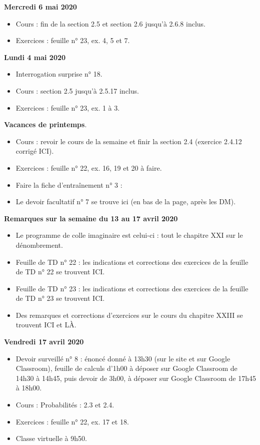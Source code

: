 \documentclass[12pt,a4paper]{article}
\begin{document}
\noindent\textbf{Mercredi 6 mai 2020}
\begin{itemize}
\item Cours : fin de la section 2.5 et section 2.6 jusqu'à 2.6.8 inclus.
\item Exercices : feuille n° 23, ex. 4, 5 et 7.\vspace{.4cm}
\end{itemize}
 
\noindent\textbf{Lundi 4 mai 2020}
\begin{itemize}
\item Interrogation surprise n° 18.
\item Cours : section 2.5 jusqu'à 2.5.17 inclus.
\item Exercices : feuille n° 23, ex. 1 à 3.\vspace{.4cm}
\end{itemize}
 
\noindent\textbf{\bf Vacances de printemps}.\vspace{.4cm}\\
\begin{itemize}
\item Cours : revoir le cours de la semaine et finir la section 2.4 (exercice 2.4.12 corrigé ICI).
\item Exercices : feuille n° 22, ex. 16, 19 et 20 à faire.
\item Faire la fiche d'entraînement n° 3 : 
\item Le devoir facultatif n° 7 se trouve ici (en bas de la page, après les DM).
\vspace{.4cm}
\end{itemize}

\noindent\textbf{\bf Remarques sur la semaine du 13 au 17 avril 2020}
\begin{itemize}
\item Le programme de colle imaginaire est celui-ci : tout le chapitre XXI sur le dénombrement.
\item Feuille de TD n° 22 : les indications et corrections des exercices de la feuille de TD n° 22 se trouvent ICI.
\item Feuille de TD n° 23 : les indications et corrections des exercices de la feuille de TD n° 23 se trouvent ICI.
\item Des remarques et corrections d'exercices sur le cours du chapitre XXIII se trouvent ICI et LÀ.\vspace{.4cm}
\end{itemize}

\noindent\textbf{\bf Vendredi 17 avril 2020}
\begin{itemize}
\item Devoir surveillé n° 8 : énoncé donné à 13h30 (sur le site et sur Google Classroom), feuille de calculs d'1h00 à déposer sur Google Classroom de 14h30 à 14h45, puis devoir de 3h00, à déposer sur Google Classroom de 17h45 à 18h00.
\item Cours : Probabilités : 2.3 et 2.4.
\item Exercices : feuille n° 22, ex. 17 et 18.
\item Classe virtuelle à 9h50.\vspace{.4cm}
\end{itemize}
\end{document}
